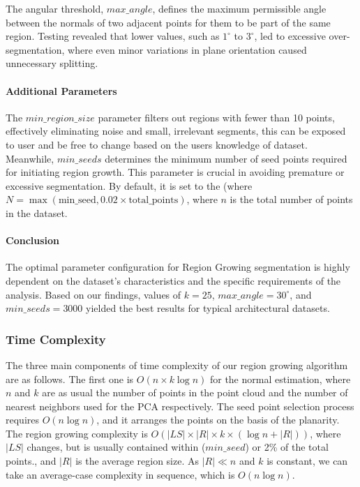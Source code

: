 \documentclass[a4paper,9pt]{article}
\begin{document}
The angular threshold, \( max\_angle \), defines the maximum permissible angle between the normals of two adjacent points for them to be part of the same region. Testing revealed that lower values, such as \( 1^\circ \) to \( 3^\circ \), led to excessive over-segmentation, where even minor variations in plane orientation caused unnecessary splitting.

\paragraph{Additional Parameters}
The \( min\_region\_size \) parameter filters out regions with fewer than 10 points, effectively eliminating noise and small, irrelevant segments, this can be exposed to user and be free to change based on the users knowledge of dataset. Meanwhile, \( min\_seeds \) determines the minimum number of seed points required for initiating region growth. This parameter is crucial in avoiding premature or excessive segmentation. By default, it is set to the (where \( N = \max(\text{min\_seed}, 0.02 \times \text{total\_points}) \), where \( n \) is the total number of points in the dataset.

\paragraph{Conclusion}
The optimal parameter configuration for Region Growing segmentation is highly dependent on the dataset's characteristics and the specific requirements of the analysis. Based on our findings, values of \( k = 25 \), \( max\_angle = 30^\circ \), and \( min\_seeds = 3000 \) yielded the best results for typical architectural datasets.



\subsubsection{Time Complexity}
The three main components of time complexity of our region growing algorithm are as follows. The first one is \( O(n \times k \log n) \) for the normal estimation, where \( n \) and \( k \) are as usual the number of points in the point cloud and the number of nearest neighbors used for the PCA respectively. The seed point selection process requires \( O(n \log n) \), and it arranges the points on the basis of the planarity. The region growing complexity is \( O(|LS| \times |R| \times k \times (\log n + |R|)) \), where \( |LS| \) changes, but is usually contained within (\( min\_seed \)) or 2\% of the total points., and \( |R| \) is the average region size. As \( |R| \ll n \) and \( k \) is constant, we can take an average-case complexity in sequence, which is \( O(n \log n) \).
\end{document}
